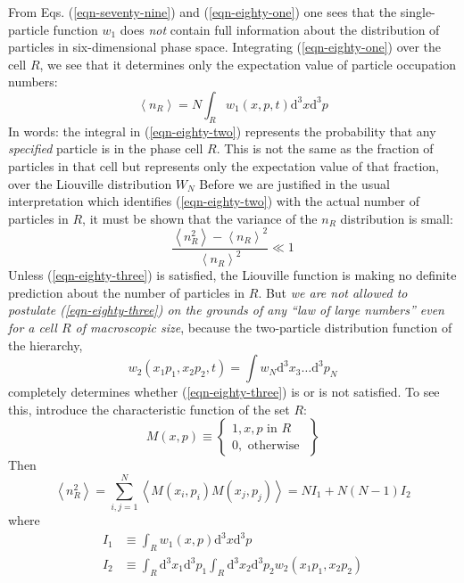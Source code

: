 \documentclass[]{article}
\begin{document}
From Eqs. (\ref{eqn-seventy-nine}) and (\ref{eqn-eighty-one}) one sees that the single-particle function $w_{1}$ does \emph{not} contain full information about the distribution of particles in six-dimensional phase space. Integrating (\ref{eqn-eighty-one}) over the cell $R$, we see that it determines only the expectation value of particle occupation numbers:
\begin{equation}
\left\langle n _{R}\right\rangle=N \int_{R} w_{1}(x, p, t)\text{d}^{3} x\text{d}^{3} p \label{eqn-eighty-two}
\end{equation}
In words: the integral in (\ref{eqn-eighty-two}) represents the probability that any \emph{specified} particle is in the phase cell $R .$ This is not the same as the fraction of particles in that cell but represents only the expectation value of that fraction, over the Liouville distribution $W_N$ Before we are justified in the usual interpretation which identifies
(\ref{eqn-eighty-two}) with the actual number of particles in $R$, it must be shown that the variance of the $n _{ R }$ distribution is small:
\begin{equation}
\frac{\left\langle n_{R}^{2}\right\rangle-\left\langle n_{R}\right\rangle^{2}}{\left\langle n_{R}\right\rangle^{2}} \ll 1 \label{eqn-eighty-three}
\end{equation}
Unless (\ref{eqn-eighty-three}) is satisfied, the Liouville function is making no definite prediction about the number of particles in $R$. But \emph{we are not allowed to postulate (\ref{eqn-eighty-three}) on the grounds of any ``law of large numbers'' even for a cell $R$ of macroscopic size}, because the two-particle distribution function of the hierarchy,
\begin{equation}
w_{2}\left(x_{1} p_{1}, x_{2} p_{2}, t\right)=\int w_{N}\text{d}^{3} x_{3} \ldots\text{d}^{3} p_{N}
\end{equation}
completely determines whether (\ref{eqn-eighty-three}) is or is not satisfied. To see this, introduce the characteristic function of the set $R$:
\begin{equation}
M(x, p) \equiv\left\{\begin{array}{l}
1, x, p \text { in } R \\
0, \text { otherwise }
\end{array}\right\}
\end{equation}
Then
\begin{equation}
\left\langle{n}_{ R }^{2}\right\rangle=\sum_{ i , j=1}^{ N }\left\langle M \left( x _{ i }, p _{ i }\right) M \left( x _{ j }, p _{ j }\right)\right\rangle= NI _{1}+ N ( N -1) I _{2}
\end{equation}
where
\begin{align}
I_{1} & \equiv \int_{R} w_{1}(x, p)\text{d}^{3} x\text{d}^{3} p \label{eqn-eighty-seven}\\
I_{2} & \equiv \int_{R}\text{d}^{3} x_{1}\text{d}^{3} p_{1} \int_{R}\text{d}^{3} x_{2}\text{d}^{3} p_{2} w_{2}\left(x_{1} p_{1}, x_{2} p_{2}\right) \label{eqn-eighty-eight}
\end{align}
\end{document}
